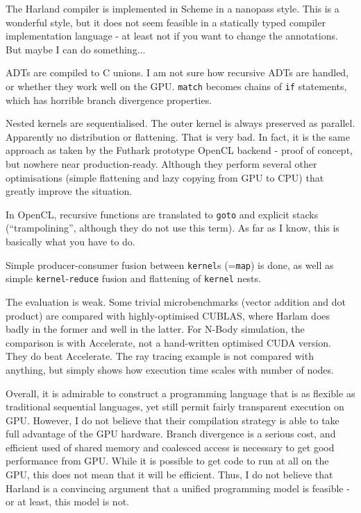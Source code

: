\documentclass[a4paper, oneside, final]{memoir}
\begin{document}
The Harland compiler is implemented in Scheme in a nanopass style.
This is a wonderful style, but it does not seem feasible in a
statically typed compiler implementation language - at least not if
you want to change the annotations.  But maybe I can do something...

ADTs are compiled to C unions.  I am not sure how recursive ADTs are
handled, or whether they work well on the GPU.  \texttt{match} becomes
chains of \texttt{if} statements, which has horrible branch divergence
properties.

Nested kernels are sequentialised.  The outer kernel is always
preserved as parallel.  Apparently no distribution or flattening.
That is very bad.  In fact, it is the same approach as taken by the
Futhark prototype OpenCL backend - proof of concept, but nowhere near
production-ready.  Although they perform several other optimisations
(simple flattening and lazy copying from GPU to CPU) that greatly
improve the situation.

In OpenCL, recursive functions are translated to \texttt{goto} and
explicit stacks (``trampolining'', although they do not use this
term).  As far as I know, this is basically what you have to do.

Simple producer-consumer fusion between \texttt{kernel}s
(=\texttt{map}) is done, as well as simple
\texttt{kernel}-\texttt{reduce} fusion and flattening of
\texttt{kernel} nests.

The evaluation is weak.  Some trivial microbenchmarks (vector addition
and dot product) are compared with highly-optimised CUBLAS, where
Harlam does badly in the former and well in the latter.  For N-Body
simulation, the comparison is with Accelerate, not a hand-written
optimised CUDA version.  They do beat Accelerate.  The ray tracing
example is not compared with anything, but simply shows how execution
time scales with number of nodes.

Overall, it is admirable to construct a programming language that is
as flexible as traditional sequential languages, yet still permit
fairly transparent execution on GPU.  However, I do not believe that
their compilation strategy is able to take full advantage of the GPU
hardware.  Branch divergence is a serious cost, and efficient used of
shared memory and coalesced access is necessary to get good
performance from GPU.  While it is possible to get code to run at all
on the GPU, this does not mean that it will be efficient.  Thus, I do
not believe that Harland is a convincing argument that a unified
programming model is feasible - or at least, this model is not.
\end{document}
